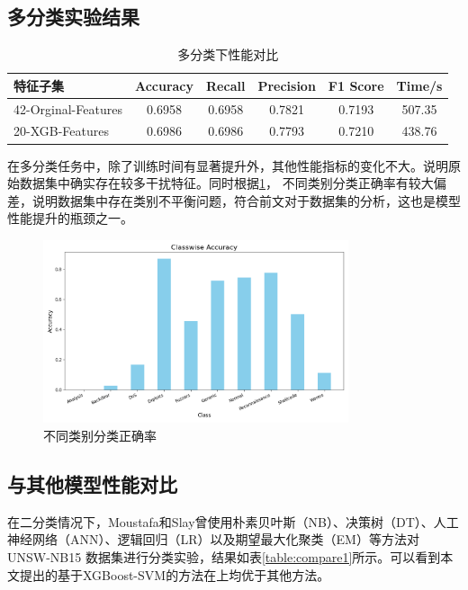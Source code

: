 \documentclass{article}
\begin{document}
\subsection{多分类实验结果}

\begin{table}[H]
  \caption{多分类下性能对比}
  \label{table:feature_selection_performance_m}
  \centering
  \begin{tabular}{lccccc}
    \toprule
    特征子集          & Accuracy & Recall & Precision & F1 Score & Time/s \\ \midrule
    42-Orginal-Features     & 0.6958   & 0.6958 & 0.7821    & 0.7193   & 507.35  \\    
    20-XGB-Features    & 0.6986   & 0.6986 & 0.7793    & 0.7210   & 438.76  \\\bottomrule 

  \end{tabular}
\end{table}
在多分类任务中，除了训练时间有显著提升外，其他性能指标的变化不大。说明原始数据集中确实存在较多干扰特征。同时根据\ref{fig:class}，
不同类别分类正确率有较大偏差，说明数据集中存在类别不平衡问题，符合前文对于数据集的分析，这也是模型性能提升的瓶颈之一。

\begin{figure}[htpb]
  \centering
  \includegraphics[width=0.8\textwidth]{./png/classwise_accuracy.png}
  \caption{不同类别分类正确率}
  \label{fig:class}
\end{figure}

\subsection{与其他模型性能对比}
在二分类情况下，Moustafa和Slay曾使用朴素贝叶斯（NB）、决策树（DT）、人工神经网络（ANN）、逻辑回归（LR）以及期望最大化聚类（EM）等方法对UNSW-NB15
数据集进行分类实验\cite{ref9}，结果如表\ref{table:compare1}所示。可以看到本文提出的基于XGBoost-SVM的方法在上均优于其他方法。
\end{document}
